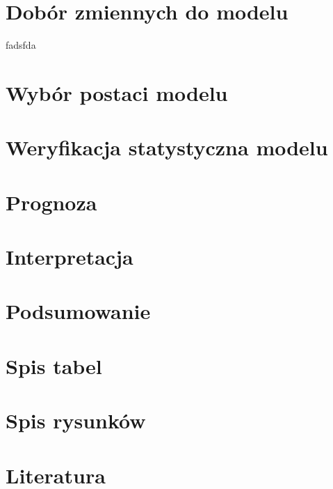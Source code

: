 \documentclass{article}
\begin{document}
\newpage
\section{Dobór zmiennych do modelu}
fadsfda
\section{Wybór postaci modelu}

\section{Weryfikacja statystyczna modelu}

\section{Prognoza}

\section{Interpretacja}

\section{Podsumowanie}

\newpage
\section{Spis tabel}
\listoftables


\newpage
\section{Spis rysunków}
\listoffigures


\newpage
\section{Literatura}
\printbibliography
\end{document}

